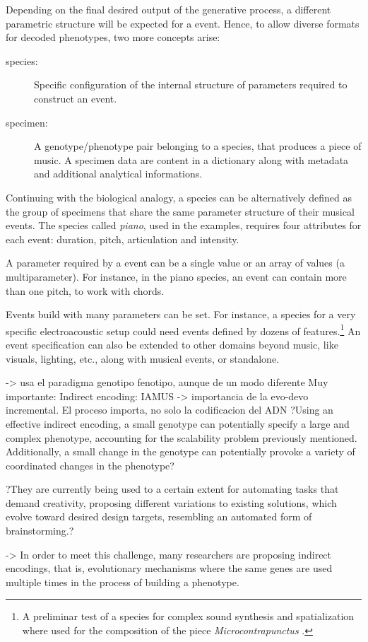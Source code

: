 \documentclass{article}
\begin{document}
Depending on the final desired output of the generative process, a different parametric structure will be expected for a event. Hence, to allow diverse formats for decoded phenotypes, two more concepts arise:  

\begin{description}
\item[species:] Specific configuration of the internal structure of parameters required to construct an event.
\item[specimen:] A genotype/phenotype pair belonging to a species, that produces a piece of music. A specimen data are content in a dictionary along with metadata and additional analytical informations.
\end{description}


Continuing with the biological analogy, a {species} can be alternatively defined as the group of specimens that share the same parameter structure of their musical events. The species called \emph{piano}, used in the examples, requires four attributes for each event: duration, pitch, articulation and intensity. 

A {parameter} required by a event can be a single value or an array of values (a {multiparameter}). For instance, in the piano species, an event can contain more than one pitch, to work with chords.

Events build with many parameters can be set. For instance, a species for a very specific electroacoustic setup could need events defined by dozens of features.\footnote{A preliminar test of a species for complex sound synthesis and spatialization where used for the composition of the piece \emph{Microcontrapunctus} \cite{microcontrapunctus}.} An event specification can also be extended to other domains beyond music, like visuals, lighting, etc., along with musical events, or standalone. 

{\color{red}




 -> usa el paradigma genotipo fenotipo, aunque de un modo diferente
Muy importante: Indirect encoding: IAMUS -> importancia de la evo-devo incremental. El proceso importa, no solo la codificacion del ADN
?Using an effective indirect encoding, a small
genotype can potentially specify a large and complex
phenotype, accounting for the scalability problem
previously mentioned. Additionally, a small change
in the genotype can potentially provoke a variety of
coordinated changes in the phenotype?

?They are currently
being used to a certain extent for automating
tasks that demand creativity, proposing different
variations to existing solutions, which evolve toward
desired design targets, resembling an automated form
of brainstorming.?


\cite{stanley:alife03} -> In order to meet this
challenge, many researchers are proposing indirect
encodings, that is, evolutionary mechanisms where the same
genes are used multiple times in the process of building a
phenotype.

}
\end{document}
